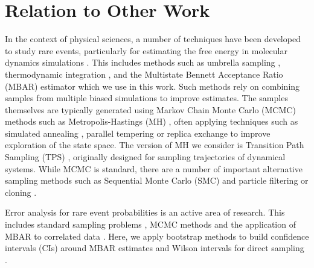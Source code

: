 \documentclass{article}
\begin{document}
\section{Relation to Other Work}

In the context of physical sciences, a number of techniques have been developed to study rare events, particularly for estimating the free energy in molecular dynamics simulations \cite{frenkel2023understanding}. This includes methods such as umbrella sampling \cite{vardi1985empirical, torrie1977nonphysical, thiede2016eigenvector}, thermodynamic integration \cite{kirkwood1935statistical,gelman1998simulating}, and the Multistate Bennett Acceptance Ratio (MBAR) estimator \cite{shirts2008statistically,shirts2017reweighting} which we use in this work.
Such methods rely on combining samples from multiple biased simulations to improve estimates. The samples themselves are typically generated using Markov Chain Monte Carlo (MCMC) methods \cite{andrieu2003an-introduction,brooks2011handbook} such as Metropolis-Hastings (MH) \cite{metropolis1953equation,hastings1970monte}, often applying techniques such as simulated annealing \cite{bertsimas1993simulated}, parallel tempering or replica exchange \cite{earl2005parallel} to improve exploration of the state space. The version of MH we consider is Transition Path Sampling (TPS) \cite{bolhuis2002transition,hedges2009dynamic}, originally designed for sampling trajectories of dynamical systems. While MCMC is standard, there are a number of important alternative sampling methods such as Sequential Monte Carlo (SMC) \cite{doucet2001sequential,cerou2012sequential} and particle filtering or cloning \cite{giardina2011simulating}. 

Error analysis for rare event probabilities is an active area of research. This includes standard sampling problems \cite{dembinski2022bias,mcgrath2024binomial}, MCMC methods \cite{flegal2010batch,rosenthal2018simple,jian2022markov} and the application of MBAR to correlated data \cite{dinner2020stratification,li2023understanding,ding2024bayesian}. Here, we apply bootstrap methods to build confidence intervals (CIs) around MBAR estimates \cite{davison1997bootstrap} and Wilson intervals for direct sampling \cite{wilson1927probable}.
\end{document}
